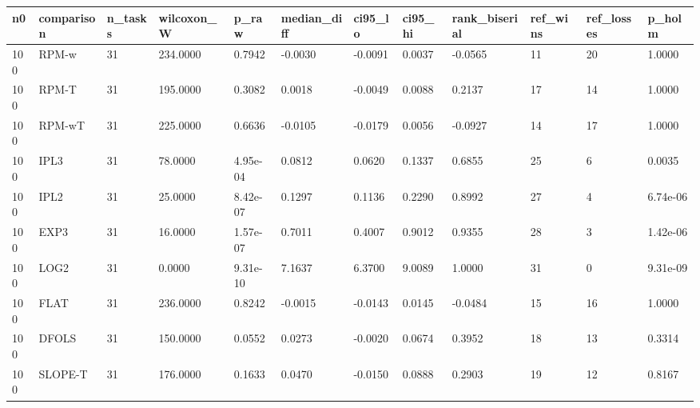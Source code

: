 \begin{tabular}{llllllllllll}
\hline
n0 & comparison & n\_tasks & wilcoxon\_W & p\_raw & median\_diff & ci95\_lo & ci95\_hi & rank\_biserial & ref\_wins & ref\_losses & p\_holm \\
\hline
100 & RPM-w & 31 & 234.0000 & 0.7942 & -0.0030 & -0.0091 & 0.0037 & -0.0565 & 11 & 20 & 1.0000 \\
100 & RPM-T & 31 & 195.0000 & 0.3082 & 0.0018 & -0.0049 & 0.0088 & 0.2137 & 17 & 14 & 1.0000 \\
100 & RPM-wT & 31 & 225.0000 & 0.6636 & -0.0105 & -0.0179 & 0.0056 & -0.0927 & 14 & 17 & 1.0000 \\
100 & IPL3 & 31 & 78.0000 & 4.95e-04 & 0.0812 & 0.0620 & 0.1337 & 0.6855 & 25 & 6 & 0.0035 \\
100 & IPL2 & 31 & 25.0000 & 8.42e-07 & 0.1297 & 0.1136 & 0.2290 & 0.8992 & 27 & 4 & 6.74e-06 \\
100 & EXP3 & 31 & 16.0000 & 1.57e-07 & 0.7011 & 0.4007 & 0.9012 & 0.9355 & 28 & 3 & 1.42e-06 \\
100 & LOG2 & 31 & 0.0000 & 9.31e-10 & 7.1637 & 6.3700 & 9.0089 & 1.0000 & 31 & 0 & 9.31e-09 \\
100 & FLAT & 31 & 236.0000 & 0.8242 & -0.0015 & -0.0143 & 0.0145 & -0.0484 & 15 & 16 & 1.0000 \\
100 & DFOLS & 31 & 150.0000 & 0.0552 & 0.0273 & -0.0020 & 0.0674 & 0.3952 & 18 & 13 & 0.3314 \\
100 & SLOPE-T & 31 & 176.0000 & 0.1633 & 0.0470 & -0.0150 & 0.0888 & 0.2903 & 19 & 12 & 0.8167 \\
\hline
\end{tabular}
